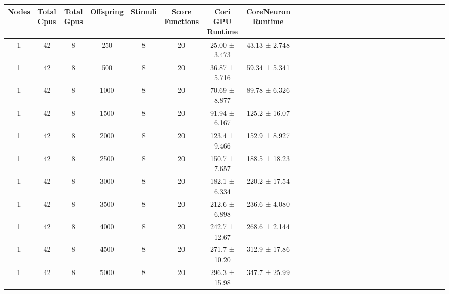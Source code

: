 \begin{tabular}{|c|c|c|c|c|c|c|c|c|c|c|c|c|c|c|c|c|c|c|c|c|c|c|c|c|c|c|c|c|}
\toprule
 Nodes &  Total Cpus &  Total Gpus &  Offspring &  Stimuli &  Score Functions & Cori GPU Runtime & CoreNeuron Runtime \\
\midrule
     1 &          42 &           8 &        250 &        8 &               20 &    25.00 ± 3.473 &      43.13 ± 2.748 \\
     1 &          42 &           8 &        500 &        8 &               20 &    36.87 ± 5.716 &      59.34 ± 5.341 \\
     1 &          42 &           8 &       1000 &        8 &               20 &    70.69 ± 8.877 &      89.78 ± 6.326 \\
     1 &          42 &           8 &       1500 &        8 &               20 &    91.94 ± 6.167 &      125.2 ± 16.07 \\
     1 &          42 &           8 &       2000 &        8 &               20 &    123.4 ± 9.466 &      152.9 ± 8.927 \\
     1 &          42 &           8 &       2500 &        8 &               20 &    150.7 ± 7.657 &      188.5 ± 18.23 \\
     1 &          42 &           8 &       3000 &        8 &               20 &    182.1 ± 6.334 &      220.2 ± 17.54 \\
     1 &          42 &           8 &       3500 &        8 &               20 &    212.6 ± 6.898 &      236.6 ± 4.080 \\
     1 &          42 &           8 &       4000 &        8 &               20 &    242.7 ± 12.67 &      268.6 ± 2.144 \\
     1 &          42 &           8 &       4500 &        8 &               20 &    271.7 ± 10.20 &      312.9 ± 17.86 \\
     1 &          42 &           8 &       5000 &        8 &               20 &    296.3 ± 15.98 &      347.7 ± 25.99 \\
\bottomrule
\end{tabular}
